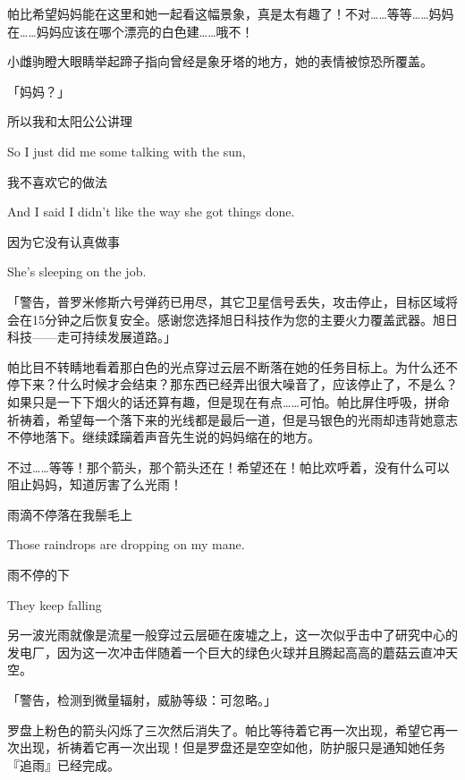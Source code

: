 帕比希望妈妈能在这里和她一起看这幅景象，真是太有趣了！不对……等等……妈妈在……妈妈应该在哪个漂亮的白色建……哦不！

小雌驹瞪大眼睛举起蹄子指向曾经是象牙塔的地方，她的表情被惊恐所覆盖。

「妈妈？」


\begin{song}
    所以我和太阳公公讲理
    
    So I just did me some talking with the sun,
    
    \medskip

    我不喜欢它的做法
    
    And I said I didn't like the way she got things done.
    
    \medskip

    因为它没有认真做事
    
    She's sleeping on the job.
\end{song}

「{\mt 警告，普罗米修斯六号弹药已用尽，其它卫星信号丢失，攻击停止，目标区域将会在15分钟之后恢复安全。感谢您选择旭日科技作为您的主要火力覆盖武器。旭日科技——走可持续发展道路。}」


帕比目不转睛地看着那白色的光点穿过云层不断落在她的任务目标上。为什么还不停下来？什么时候才会结束？那东西已经弄出很大噪音了，应该停止了，不是么？如果只是一下下烟火的话还算有趣，但是现在有点……可怕。帕比屏住呼吸，拼命祈祷着，希望每一个落下来的光线都是最后一道，但是马银色的光雨却违背她意志不停地落下。继续蹂躏着声音先生说的妈妈缩在的地方。

不过……等等！那个箭头，那个箭头还在！希望还在！帕比欢呼着，没有什么可以阻止妈妈，知道厉害了么光雨！


\begin{song}
    雨滴不停落在我鬃毛上
    
    Those raindrops are dropping on my mane.
    
    \medskip

    雨不停的下
    
    They keep falling
\end{song}

另一波光雨就像是流星一般穿过云层砸在废墟之上，这一次似乎击中了研究中心的发电厂，因为这一次冲击伴随着一个巨大的绿色火球并且腾起高高的蘑菇云直冲天空。

「{\mt 警告，检测到微量辐射，威胁等级：可忽略。}」

罗盘上粉色的箭头闪烁了三次然后消失了。帕比等待着它再一次出现，希望它再一次出现，祈祷着它再一次出现！但是罗盘还是空空如他，防护服只是通知她任务『追雨』已经完成。

